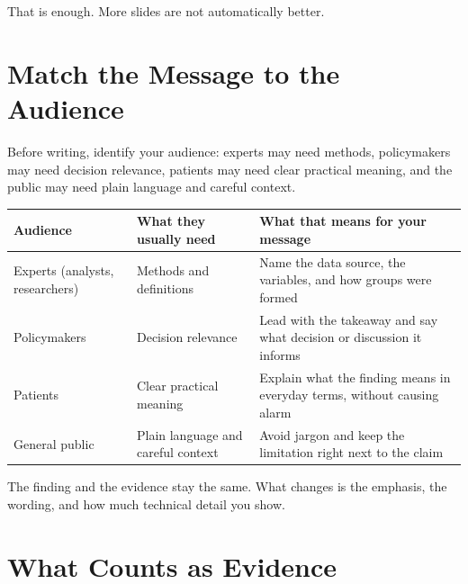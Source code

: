 \documentclass[
  letterpaper,
  DIV=11,
  numbers=noendperiod,
  oneside]{scrreprt}
\begin{document}
That is enough. More slides are not automatically better.

\section*{Match the Message to the
Audience}\label{match-the-message-to-the-audience}


Before writing, identify your audience: experts may need methods,
policymakers may need decision relevance, patients may need clear
practical meaning, and the public may need plain language and careful
context.

\begin{longtable}[]{@{}
  >{\raggedright\arraybackslash}p{}
  >{\raggedright\arraybackslash}p{}
  >{\raggedright\arraybackslash}p{}@{}}
\toprule\noalign{}
\begin{minipage}[b]{\linewidth}\raggedright
Audience
\end{minipage} & \begin{minipage}[b]{\linewidth}\raggedright
What they usually need
\end{minipage} & \begin{minipage}[b]{\linewidth}\raggedright
What that means for your message
\end{minipage} \\
\midrule\noalign{}
\endhead
\bottomrule\noalign{}
\endlastfoot
Experts (analysts, researchers) & Methods and definitions & Name the
data source, the variables, and how groups were formed \\
Policymakers & Decision relevance & Lead with the takeaway and say what
decision or discussion it informs \\
Patients & Clear practical meaning & Explain what the finding means in
everyday terms, without causing alarm \\
General public & Plain language and careful context & Avoid jargon and
keep the limitation right next to the claim \\
\end{longtable}

The finding and the evidence stay the same. What changes is the
emphasis, the wording, and how much technical detail you show.

\section*{What Counts as Evidence}\label{what-counts-as-evidence}
\end{document}
